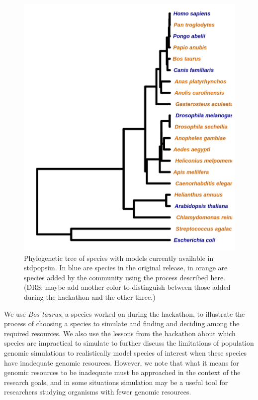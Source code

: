 \documentclass[hidelinks]{article}
\begin{document}
\begin{figure}
  \includegraphics[width=\linewidth]{./figs/species_fig.png}
  \caption{Phylogenetic tree of species with models currently available in stdpopsim. 
           In blue are species in the original release, in orange are species added 
           by the community using the process described here. (DRS: maybe add another
           color to distinguish between those added during the hackathon and the other three.)}
  \label{fig:tree}
\end{figure}

We use \emph{Bos taurus}, a species worked on during the hackathon, to
illustrate the process of choosing a species to simulate and finding and
deciding among the required resources. We also use the lessons from the
hackathon about which species are impractical to simulate to further
discuss the limitations of population genomic simulations to
realistically model species of interest when these species have
inadequate genomic resources. However, we note that what it means for genomic resources to
be inadequate must be approached in the context of the research goals,
and in some situations simulation may be a useful tool for researchers
studying organisms with fewer genomic resources.
\end{document}

